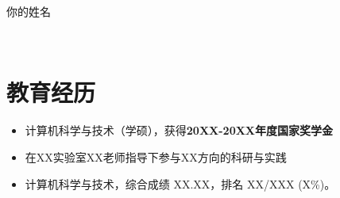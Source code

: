 \documentclass{resume}
\newcommand{\en}[1]{}
\newcommand{\zh}[1]{#1}
\newcommand{\en}[1]{#1}
\newcommand{\zh}[1]{}
\begin{document}
\noindent
\begin{minipage}[t]{0.74\textwidth}
  {\Huge\scshape \en{Your Name}\zh{你的姓名}\par}
  \vspace{1.25ex}
  {\ttfamily\large
     \textperiodcentered\
     \textperiodcentered\
    \par
  }
\end{minipage}\hfill
\begin{minipage}[t]{0.24\textwidth}
  \raggedleft
\end{minipage}
\vspace{0.2ex}

\section{\en{Education}\zh{教育经历}}

\en{\datedsubsection{\textbf{Your University}, Master of Science}{09/2024 -- 06/2027}}
\zh{}
\begin{itemize}[parsep=0.25ex]
	\en{\item Major in Computer Science; awarded the \textbf{National Scholarship (20XX-20XX)}.}
	\zh{\item 计算机科学与技术（学硕），获得\textbf{20XX-20XX年度国家奖学金}}
	\en{\item Research area: your research direction, under the supervision of Prof. XXX.}
	\zh{\item 在XX实验室XX老师指导下参与XX方向的科研与实践}
\end{itemize}

\en{\datedsubsection{\textbf{Your University}, Bachelor of Engineering}{09/2020 -- 06/2024}}
\zh{}
\begin{itemize}[parsep=0.25ex]
	\en{\item Major in Computer Science, GPA: X.XX/4.0, rank: XX/XXX (top X\%).}
	\zh{\item 计算机科学与技术，综合成绩 XX.XX，排名 XX/XXX (X\%)。}
\end{itemize}
\end{document}
